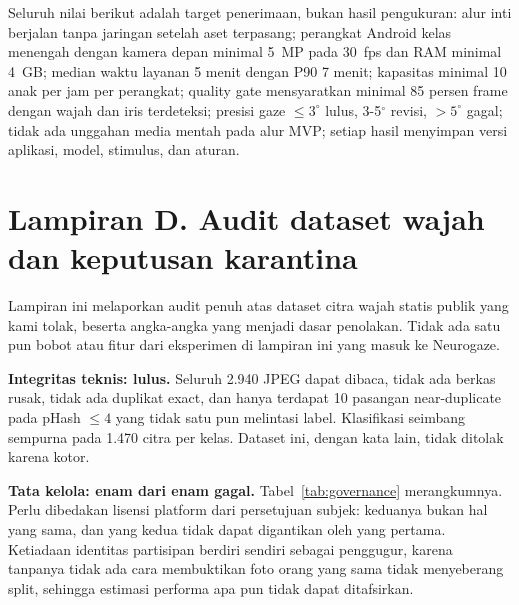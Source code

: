 \documentclass{article}
\begin{document}

Seluruh nilai berikut adalah target penerimaan, bukan hasil pengukuran: alur inti berjalan
tanpa jaringan setelah aset terpasang; perangkat Android kelas menengah dengan kamera depan
minimal 5~MP pada 30~fps dan RAM minimal 4~GB; median waktu layanan 5 menit dengan P90 7
menit; kapasitas minimal 10 anak per jam per perangkat; quality gate mensyaratkan minimal
85 persen frame dengan wajah dan iris terdeteksi; presisi gaze $\leq 3^\circ$ lulus,
3-5$^\circ$ revisi, $> 5^\circ$ gagal; tidak ada unggahan media mentah pada alur MVP; setiap
hasil menyimpan versi aplikasi, model, stimulus, dan aturan.

\section*{Lampiran D. Audit dataset wajah dan keputusan karantina}
\label{app:audit-wajah}

Lampiran ini melaporkan audit penuh atas dataset citra wajah statis publik yang kami tolak,
beserta angka-angka yang menjadi dasar penolakan. Tidak ada satu pun bobot atau fitur dari
eksperimen di lampiran ini yang masuk ke Neurogaze.

\textbf{Integritas teknis: lulus.} Seluruh 2.940 JPEG dapat dibaca, tidak ada berkas rusak,
tidak ada duplikat exact, dan hanya terdapat 10 pasangan near-duplicate pada pHash $\leq 4$
yang tidak satu pun melintasi label. Klasifikasi seimbang sempurna pada 1.470 citra per kelas.
Dataset ini, dengan kata lain, tidak ditolak karena kotor.

\textbf{Tata kelola: enam dari enam gagal.} Tabel~\ref{tab:governance} merangkumnya. Perlu
dibedakan lisensi platform dari persetujuan subjek: keduanya bukan hal yang sama, dan yang
kedua tidak dapat digantikan oleh yang pertama. Ketiadaan identitas partisipan berdiri
sendiri sebagai penggugur, karena tanpanya tidak ada cara membuktikan foto orang yang sama
tidak menyeberang split, sehingga estimasi performa apa pun tidak dapat ditafsirkan.
\end{document}
